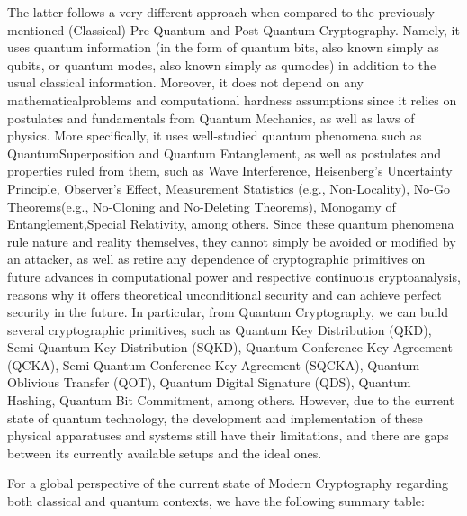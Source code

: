 \documentclass[runningheads]{llncs}
\numberwithin{equation}{section}
\begin{document}
    The latter follows a very different approach when compared to the previously mentioned (Classical) Pre-Quantum and Post-Quantum Cryptography. Namely, it uses quantum information (in the form of quantum bits, also known simply as qubits, or quantum modes, also known simply as qumodes) in addition to the usual classical information. Moreover, it does not depend on any mathematical\break problems and computational hardness assumptions since it relies on postulates and fundamentals from Quantum Mechanics, as well as laws of physics. More specifically, it uses well-studied quantum phenomena such as Quantum\break Superposition and Quantum Entanglement, as well as postulates and properties ruled from them, such as Wave Interference, Heisenberg's Uncertainty Principle, Observer's Effect, Measurement Statistics (e.g., Non-Locality), No-Go Theorems\break (e.g., No-Cloning and No-Deleting Theorems), Monogamy of Entanglement,\break Special Relativity, among others. Since these quantum phenomena rule nature and reality themselves, they cannot simply be avoided or modified by an attacker, as well as retire any dependence of cryptographic primitives on future advances in computational power and respective continuous cryptoanalysis, reasons why it offers theoretical unconditional security and can achieve perfect security in the future. In particular, from Quantum Cryptography, we can build several cryptographic primitives, such as Quantum Key Distribution (QKD), Semi-Quantum Key Distribution (SQKD), Quantum Conference Key Agreement (QCKA), Semi-Quantum Conference Key Agreement (SQCKA), Quantum Oblivious Transfer (QOT), Quantum Digital Signature (QDS), Quantum Hashing, Quantum Bit Commitment, among others. However, due to the current state of quantum technology, the development and implementation of these physical apparatuses and systems still have their limitations, and there are gaps between its currently available setups and the ideal ones.


    \newpage
    
    \noindent For a global perspective of the current state of Modern Cryptography regarding both classical and quantum contexts, we have the following summary table:
\end{document}
